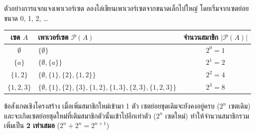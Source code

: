 \begin{frame}{ตัวอย่างการแจกแจงเพาเวอร์เซต}
  ลองไล่เขียนเพาเวอร์เซตจากขนาดเล็กไปใหญ่ โดยเริ่มจากเซตย่อยขนาด 0, 1, 2, \ldots
  \begin{center}\small
  \begin{tabular}{|c|l|c|}
    \hline
    \textbf{เซต $A$} & \textbf{เพาเวอร์เซต $\mathcal{P}(A)$} & \textbf{จำนวนสมาชิก $|\mathcal{P}(A)|$} \\ \hline
    $\emptyset$ & $\{\emptyset\}$ & $2^0 = 1$ \\ \hline
    $\{a\}$ & $\{\emptyset, \{a\}\}$ & $2^1 = 2$ \\ \hline
    $\{1, 2\}$ & $\{\emptyset, \{1\}, \{2\}, \{1, 2\}\}$ & $2^2 = 4$ \\ \hline
    $\{1, 2, 3\}$ & $\{\emptyset, \{1\}, \{2\}, \{3\}, \{1,2\}, \{1,3\}, \{2,3\}, \{1,2,3\}\}$ & $2^3 = 8$ \\ \hline
  \end{tabular}
  \end{center}
  \vspace{0.2em}
  \begin{exampleblock}{ข้อสังเกตเชิงโครงสร้าง}
    เมื่อเพิ่มสมาชิกใหม่เข้ามา 1 ตัว เซตย่อยชุดเดิมจะยังคงอยู่ครบ ($2^n$ เซตเดิม)
    และจะเกิดเซตย่อยชุดใหม่ที่เติมสมาชิกตัวนั้นเข้าไปอีกเท่าตัว ($2^n$ เซตใหม่)
    ทำให้จำนวนสมาชิกรวมเพิ่มเป็น \textbf{2 เท่าเสมอ} ($2^n + 2^n = 2^{n+1}$)
  \end{exampleblock}
\end{frame}


